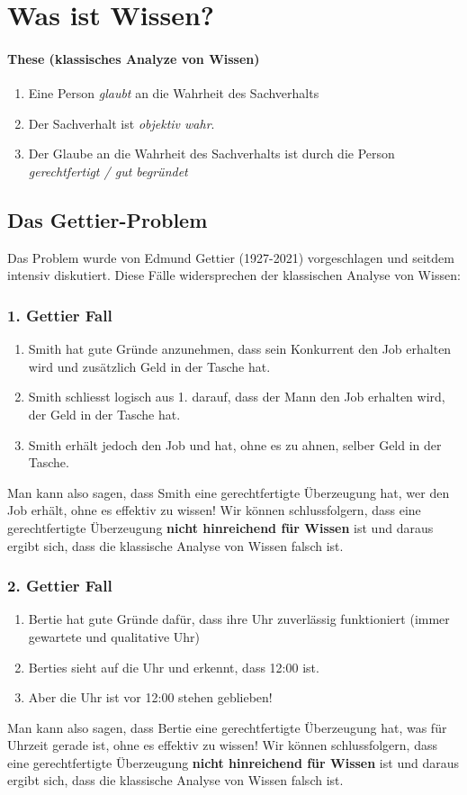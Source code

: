 \documentclass[../main.tex]{subfiles}
\begin{document}
\section{Was ist Wissen?}
\paragraph{These (klassisches Analyze von Wissen)}
\begin{enumerate}
	\item Eine Person \textit{glaubt} an die Wahrheit des Sachverhalts
	\item Der Sachverhalt ist \textit{objektiv wahr}.
	\item Der Glaube an die Wahrheit des Sachverhalts ist durch die Person \textit{gerechtfertigt / gut begründet}
\end{enumerate}

\subsection{Das Gettier-Problem}
Das Problem wurde von Edmund Gettier (1927-2021) vorgeschlagen und seitdem intensiv diskutiert. Diese Fälle widersprechen der klassischen Analyse von Wissen:
\subsubsection{1. Gettier Fall}
\begin{enumerate}
	\item Smith hat gute Gründe anzunehmen, dass sein Konkurrent den Job erhalten wird und zusätzlich Geld in der Tasche hat. 
	\item Smith schliesst logisch aus 1. darauf, dass der Mann den Job erhalten wird, der Geld in der Tasche hat. 
	\item Smith erhält jedoch den Job und hat, ohne es zu ahnen, selber Geld in der Tasche. 
\end{enumerate}

Man kann also sagen, dass Smith eine gerechtfertigte Überzeugung hat, wer den Job erhält, ohne es effektiv zu wissen! Wir können schlussfolgern, dass eine gerechtfertigte Überzeugung \textbf{nicht hinreichend für Wissen} ist und daraus ergibt sich, dass die klassische Analyse von Wissen falsch ist. 

\subsubsection{2. Gettier Fall}
\begin{enumerate}
	\item Bertie hat gute Gründe dafür, dass ihre Uhr zuverlässig funktioniert (immer gewartete und qualitative Uhr)
	\item Berties sieht auf die Uhr und erkennt, dass 12:00 ist.
	\item Aber die Uhr ist vor 12:00 stehen geblieben!
\end{enumerate}
Man kann also sagen, dass Bertie eine gerechtfertigte Überzeugung hat, was für Uhrzeit gerade ist, ohne es effektiv zu wissen! Wir können schlussfolgern, dass eine gerechtfertigte Überzeugung \textbf{nicht hinreichend für Wissen} ist und daraus ergibt sich, dass die klassische Analyse von Wissen falsch ist. 
\end{document}
